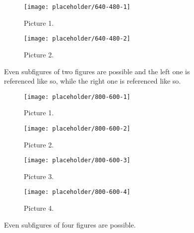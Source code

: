 \begin{figure}
    \centering
    \begin{subfigure}[b]{0.49\textwidth}
        \texttt{[image: placeholder/640-480-1]}
        \caption{Picture 1.}
        \label{fig:subfigures-two:1}
    \end{subfigure}
    \hfill
    \begin{subfigure}[b]{0.49\textwidth}
        \texttt{[image: placeholder/640-480-2]}
        \caption{Picture 2.}
        \label{fig:subfigures-two:2}
    \end{subfigure}
    
    \caption{Even subfigures of two figures are possible and the left one is referenced like  so, while the right one is referenced like  so.}
    \label{fig:subfigures-two}
\end{figure}

\begin{figure}
    \centering
    \begin{subfigure}[b]{0.49\textwidth}
        \texttt{[image: placeholder/800-600-1]}
        \caption{Picture 1.}
        \label{fig:subfigures-four:1}
    \end{subfigure}
    \hfill
    \begin{subfigure}[b]{0.49\textwidth}
        \texttt{[image: placeholder/800-600-2]}
        \caption{Picture 2.}
        \label{fig:subfigures-four:2}
    \end{subfigure}
    \hfill
    \begin{subfigure}[b]{0.49\textwidth}
        \texttt{[image: placeholder/800-600-3]}
        \caption{Picture 3.}
        \label{fig:subfigures-four:3}
    \end{subfigure}
    \hfill
    \begin{subfigure}[b]{0.49\textwidth}
        \texttt{[image: placeholder/800-600-4]}
        \caption{Picture 4.}
        \label{fig:subfigures-four:4}
    \end{subfigure}
    
    \caption{Even subfigures of four figures are possible.}
    \label{fig:subfigures-four}
\end{figure}

